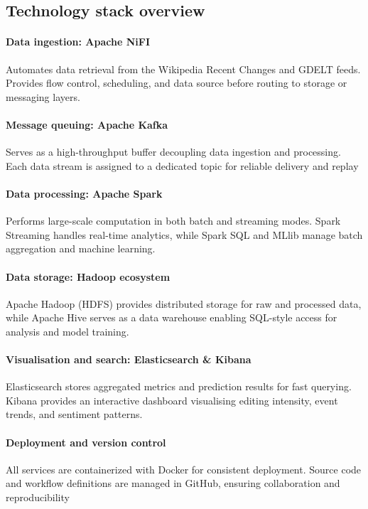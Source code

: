 \documentclass{article}
\begin{document}
\subsection{Technology stack overview}

\paragraph{Data ingestion: Apache NiFI}
Automates data retrieval from the Wikipedia Recent Changes and GDELT feeds. Provides flow control, scheduling, and data source before routing to storage or messaging layers. 

\paragraph{Message queuing: Apache Kafka}
Serves as a high-throughput buffer decoupling data ingestion and processing. Each data stream is assigned to a dedicated topic for reliable delivery and replay 

\paragraph{Data processing: Apache Spark}
Performs large-scale computation in both batch and streaming modes. Spark Streaming handles real-time analytics, while Spark SQL and MLlib manage batch aggregation and machine learning.

\paragraph{Data storage: Hadoop ecosystem}
Apache Hadoop (HDFS) provides distributed storage for raw and processed data, while Apache Hive serves as a data warehouse enabling SQL-style access for analysis and model training. 

\paragraph{Visualisation and search: Elasticsearch \& Kibana}
Elasticsearch stores aggregated metrics and prediction results for fast querying. Kibana provides an interactive dashboard visualising editing intensity, event trends, and sentiment patterns. 

\paragraph{Deployment and version control}
All services are containerized with Docker for consistent deployment. Source code and workflow definitions are managed in GitHub, ensuring collaboration and reproducibility
\end{document}
